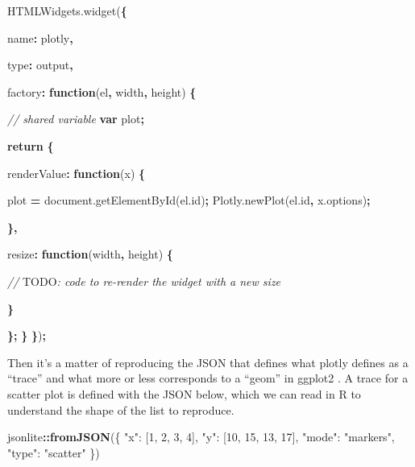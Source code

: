 \documentclass[
]{krantz}
\makeatletter
\newenvironment{Shaded}{\begin{snugshade}}{\end{snugshade}}
\newcommand{\AlertTok}[1]{\textcolor[rgb]{0.33,0.33,0.33}{#1}}
\newcommand{\AttributeTok}[1]{\textcolor[rgb]{0.61,0.61,0.61}{#1}}
\newcommand{\CommentTok}[1]{\textcolor[rgb]{0.37,0.37,0.37}{\textit{#1}}}
\newcommand{\ControlFlowTok}[1]{\textcolor[rgb]{0.27,0.27,0.27}{\textbf{#1}}}
\newcommand{\DataTypeTok}[1]{\textcolor[rgb]{0.27,0.27,0.27}{#1}}
\newcommand{\KeywordTok}[1]{\textcolor[rgb]{0.27,0.27,0.27}{\textbf{#1}}}
\newcommand{\NormalTok}[1]{#1}
\newcommand{\OperatorTok}[1]{\textcolor[rgb]{0.43,0.43,0.43}{\textbf{#1}}}
\newcommand{\StringTok}[1]{\textcolor[rgb]{0.5,0.5,0.5}{#1}}
\newcommand{\VariableTok}[1]{\textcolor[rgb]{0,0,0}{#1}}
\newenvironment{kframe}{%
\medskip{}
\setlength{\fboxsep}{.8em}
 \def\at@end@of@kframe{}%
 \ifinner\ifhmode%
  \def\at@end@of@kframe{\end{minipage}}%
  \begin{minipage}{\columnwidth}%
 \fi\fi%
 \def\FrameCommand##1{\hskip\@totalleftmargin \hskip-\fboxsep
 \colorbox{shadecolor}{##1}\hskip-\fboxsep
     \hskip-\linewidth \hskip-\@totalleftmargin \hskip\columnwidth}%
 \MakeFramed {\advance\hsize-\width
   \@totalleftmargin\z@ \linewidth\hsize
   \@setminipage}}%
 {\par\unskip\endMakeFramed%
 \at@end@of@kframe}
\renewenvironment{Shaded}{\begin{kframe}}{\end{kframe}}
\makeatother
\begin{document}
\begin{Shaded}
\begin{Highlighting}[]
\VariableTok{HTMLWidgets}\NormalTok{.}\AttributeTok{widget}\NormalTok{(}\OperatorTok{\{}

  \DataTypeTok{name}\OperatorTok{:} \StringTok{\textquotesingle{}plotly\textquotesingle{}}\OperatorTok{,}

  \DataTypeTok{type}\OperatorTok{:} \StringTok{\textquotesingle{}output\textquotesingle{}}\OperatorTok{,}

  \DataTypeTok{factory}\OperatorTok{:} \KeywordTok{function}\NormalTok{(el}\OperatorTok{,}\NormalTok{ width}\OperatorTok{,}\NormalTok{ height) }\OperatorTok{\{}

    \CommentTok{// shared variable}
    \KeywordTok{var}\NormalTok{ plot}\OperatorTok{;}

    \ControlFlowTok{return} \OperatorTok{\{}

      \DataTypeTok{renderValue}\OperatorTok{:} \KeywordTok{function}\NormalTok{(x) }\OperatorTok{\{}

\NormalTok{        plot }\OperatorTok{=} \VariableTok{document}\NormalTok{.}\AttributeTok{getElementById}\NormalTok{(}\VariableTok{el}\NormalTok{.}\AttributeTok{id}\NormalTok{)}\OperatorTok{;}
        \VariableTok{Plotly}\NormalTok{.}\AttributeTok{newPlot}\NormalTok{(}\VariableTok{el}\NormalTok{.}\AttributeTok{id}\OperatorTok{,} \VariableTok{x}\NormalTok{.}\AttributeTok{options}\NormalTok{)}\OperatorTok{;}

      \OperatorTok{\},}

      \DataTypeTok{resize}\OperatorTok{:} \KeywordTok{function}\NormalTok{(width}\OperatorTok{,}\NormalTok{ height) }\OperatorTok{\{}

        \CommentTok{// }\AlertTok{TODO}\CommentTok{: code to re{-}render the widget with a new size}

      \OperatorTok{\}}

    \OperatorTok{\};}
  \OperatorTok{\}}
\OperatorTok{\}}\NormalTok{)}\OperatorTok{;}
\end{Highlighting}
\end{Shaded}

Then it's a matter of reproducing the JSON that defines what plotly defines as a ``trace'' and what more or less corresponds to a ``geom'' in ggplot2 \citep{R-ggplot2}. A trace for a scatter plot is defined with the JSON below, which we can read in R to understand the shape of the list to reproduce.

\begin{Shaded}
\begin{Highlighting}[]
\NormalTok{jsonlite}\OperatorTok{::}\KeywordTok{fromJSON}\NormalTok{(}\StringTok{\textquotesingle{}\{}
\StringTok{	"x": [1, 2, 3, 4],}
\StringTok{	"y": [10, 15, 13, 17],}
\StringTok{	"mode": "markers",}
\StringTok{	"type": "scatter"}
\StringTok{\}\textquotesingle{}}\NormalTok{)}
\end{Highlighting}
\end{Shaded}
\end{document}
